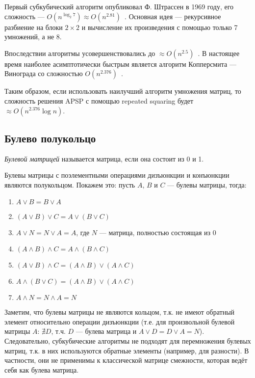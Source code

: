 Первый субкубический алгоритм опубликовал Ф. Штрассен в 1969 году, его сложность --- $O(n^{\log_2 7}) \approx O(n^{2.81})$~\cite{Strassen1969}. Основная идея --- рекурсивное разбиение на блоки $2 \times 2$ и вычисление их произведения с помощью только 7 умножений, а не 8.

Впоследствии алгоритмы усовершенствовались до ${\approx} O(n^{2.5})$~\cite{Pan1978,BiniCapoRoma1979,Schonhage1981,CoppWino1982}. В настоящее время наиболее асимптотически быстрым является алгоритм Копперсмита --- Винограда со сложностью $O(n^{2.376})$~\cite{CoppWino1990}.

Таким образом, если использовать наилучший алгоритм умножения матриц, то сложность решения APSP с помощью repeated squaring будет ${\approx}O(n^{2.376} \log n)$.

\subsection{Булево полукольцо}
\begin{definition}
  \textit{Булевой матрицей} называется матрица, если она состоит из 0 и 1.
\end{definition}

Булевы матрицы с поэлементными операциями дизъюнкции и конъюнкции являются полукольцом. Покажем это: пусть $A$, $B$ и $C$ --- булевы матрицы, тогда:
\begin{enumerate}
    \item $A \vee B = B \vee A$
    \item $(A \vee B) \vee C = A \vee (B \vee C)$
    \item $A \vee N = N \vee A = A$, где $N$ --- матрица, полностью состоящая из 0
    
    \item $(A \wedge B) \wedge C = A \wedge (B \wedge C)$
    
    \item $(A \vee B) \wedge C = (A \wedge B) \vee (A \wedge C)$
    \item $A \wedge (B \vee C) = (A \wedge B) \vee (A \wedge C)$
    
    \item $A \wedge N = N \wedge A = N$
\end{enumerate}

Заметим, что булевы матрицы не являются кольцом, т.к. не имеют обратный элемент относительно операции дизъюнкции (т.е. для произвольной булевой матрицы $A$: $\nexists D$, т.ч. $D$ --- булева матрица и $A \vee D = D \vee A = N$). Следовательно, субкубические алгоритмы не подходят для перемножения булевых матриц, т.к. в них используются обратные элементы (например, для разности). В частности, они не применимы к классической матрице смежности, которая ведёт себя как булева матрица.


